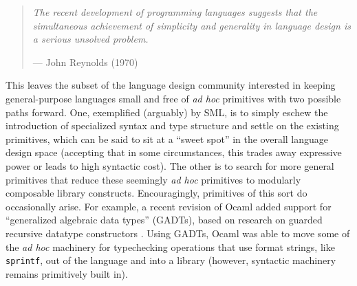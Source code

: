 \newpage
\begin{quote}\textit{The recent development of programming languages suggests that the simul\-taneous achievement of simplicity 
and generality in language design is a serious unsolved 
problem.}\begin{flushright}--- John Reynolds (1970)\end{flushright}
\end{quote}

This leaves the subset of the  language design community interested in keeping general-purpose languages small and free of \emph{ad hoc} primitives with two possible paths forward. One, exemplified (arguably) by SML, is to simply eschew the introduction of specialized syntax and type structure and settle on the existing primitives, which can be said to sit at a ``sweet spot'' in the overall language design space (accepting that in some circumstances, this trades away expressive power or leads to  high syntactic cost). %
The other is to search for more general primitives that reduce these seemingly \emph{ad hoc} primitives to modularly composable library constructs. %
Encouragingly, primitives of this sort do occasionally arise. For example, a recent revision of Ocaml added support for  ``generalized algebraic data types'' (GADTs), based on research on guarded recursive datatype constructors \cite{XiCheChe03}. Using GADTs, Ocaml was able to move some of the \emph{ad hoc} machinery for typechecking operations that use format strings, like \texttt{sprintf}, out of the language and into a library (however, syntactic machinery remains primitively built in). 



